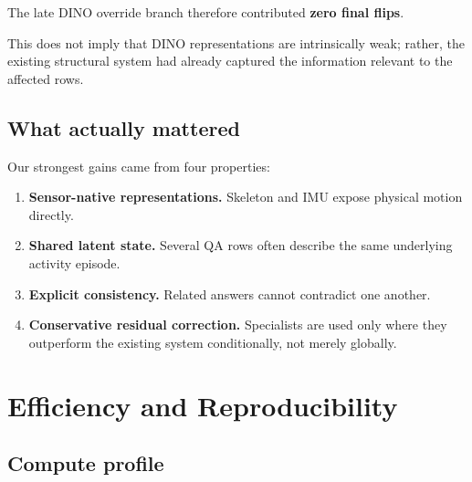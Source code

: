 \documentclass[12pt,a4paper]{article}
\begin{document}
The late DINO override branch therefore contributed \textbf{zero final flips}.

This does not imply that DINO representations are intrinsically weak; rather,
the existing structural system had already captured the information relevant to
the affected rows.

\subsection{What actually mattered}

Our strongest gains came from four properties:

\begin{enumerate}
    \item \textbf{Sensor-native representations.}
    Skeleton and IMU expose physical motion directly.

    \item \textbf{Shared latent state.}
    Several QA rows often describe the same underlying activity episode.

    \item \textbf{Explicit consistency.}
    Related answers cannot contradict one another.

    \item \textbf{Conservative residual correction.}
    Specialists are used only where they outperform the existing system
    conditionally, not merely globally.
\end{enumerate}

\section{Efficiency and Reproducibility}

\subsection{Compute profile}
\end{document}
